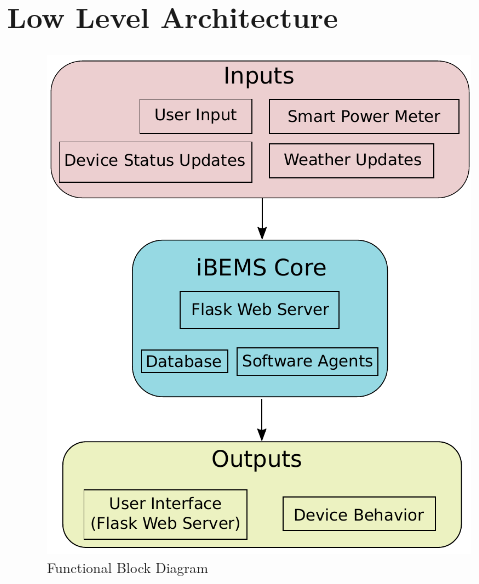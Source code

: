 \section{Low Level Architecture}
\begin{figure}[H]
    \centering
    \includegraphics[scale=0.8]{figs/functionalBlockDiagram.pdf}
    \caption{Functional Block Diagram}
    \label{fig:functional_bd}
\end{figure}


